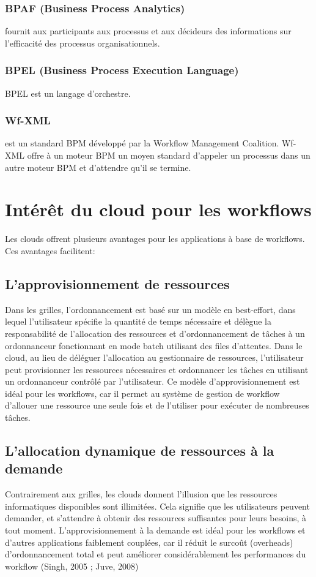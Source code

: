 \subsubsection {BPAF (Business Process Analytics)} 
fournit aux participants aux processus et aux décideurs des informations sur l'efficacité des processus organisationnels.
\subsubsection {BPEL (Business Process Execution Language)}
 BPEL est un langage d'orchestre.
\subsubsection { Wf-XML }
est un standard BPM développé par la Workflow Management Coalition. Wf-XML offre à un moteur BPM un moyen standard d'appeler un processus dans un autre moteur BPM et d'attendre qu'il se termine.
 
 

\section{ Intérêt du cloud pour les workflows }
Les clouds offrent plusieurs avantages pour les applications à base de workflows. 
Ces avantages facilitent: 
\subsection{L’approvisionnement de ressources }
Dans les grilles, l'ordonnancement est basé sur un modèle en best-effort, dans lequel l’utilisateur spécifie la quantité de temps nécessaire et délègue la responsabilité de l'allocation des ressources et d'ordonnancement de tâches à un ordonnanceur fonctionnant en mode batch utilisant des files d’attentes. Dans le cloud, au lieu de déléguer l’allocation au gestionnaire de ressources, l'utilisateur peut provisionner les ressources nécessaires et ordonnancer les tâches en utilisant un ordonnanceur contrôlé par l'utilisateur. Ce modèle d’approvisionnement est idéal pour les workflows, car il permet au système de gestion de workflow d'allouer une ressource une seule fois et de l'utiliser pour exécuter de nombreuses tâches. 
\subsection{L’allocation dynamique de ressources à la demande }
Contrairement aux grilles, les clouds donnent l'illusion que les ressources informatiques disponibles sont illimitées. Cela signifie que les utilisateurs peuvent demander, et s’attendre à obtenir des ressources suffisantes pour leurs besoins, à tout moment. L’approvisionnement à la demande est idéal pour les workflows et d'autres applications faiblement couplées, car il réduit le surcoût (overheads) d’ordonnancement total et peut améliorer considérablement les performances du workflow (Singh, 2005 ; Juve, 2008) 
